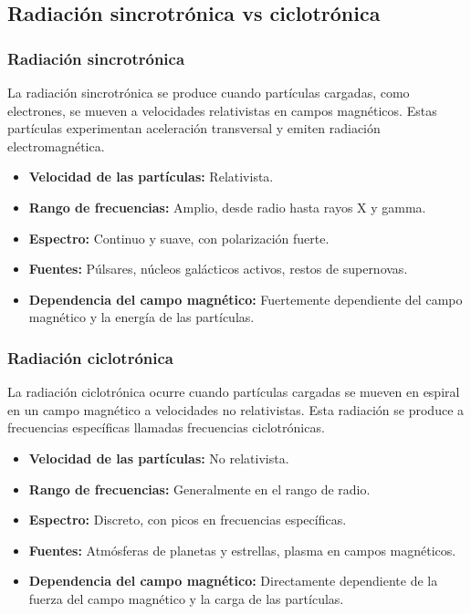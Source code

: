 \documentclass{article}
\begin{document}
\subsection*{Radiación sincrotrónica vs ciclotrónica}

\subsubsection*{Radiación sincrotrónica}

La radiación sincrotrónica se produce cuando partículas cargadas, como electrones, se mueven a velocidades relativistas en campos magnéticos. Estas partículas experimentan aceleración transversal y emiten radiación electromagnética.

\begin{itemize}
    \item \textbf{Velocidad de las partículas:} Relativista.
    \item \textbf{Rango de frecuencias:} Amplio, desde radio hasta rayos X y gamma.
    \item \textbf{Espectro:} Continuo y suave, con polarización fuerte.
    \item \textbf{Fuentes:} Púlsares, núcleos galácticos activos, restos de supernovas.
    \item \textbf{Dependencia del campo magnético:} Fuertemente dependiente del campo magnético y la energía de las partículas.
\end{itemize}

\subsubsection*{Radiación ciclotrónica}

La radiación ciclotrónica ocurre cuando partículas cargadas se mueven en espiral en un campo magnético a velocidades no relativistas. Esta radiación se produce a frecuencias específicas llamadas frecuencias ciclotrónicas.

\begin{itemize}
    \item \textbf{Velocidad de las partículas:} No relativista.
    \item \textbf{Rango de frecuencias:} Generalmente en el rango de radio.
    \item \textbf{Espectro:} Discreto, con picos en frecuencias específicas.
    \item \textbf{Fuentes:} Atmósferas de planetas y estrellas, plasma en campos magnéticos.
    \item \textbf{Dependencia del campo magnético:} Directamente dependiente de la fuerza del campo magnético y la carga de las partículas.
\end{itemize}
\end{document}
